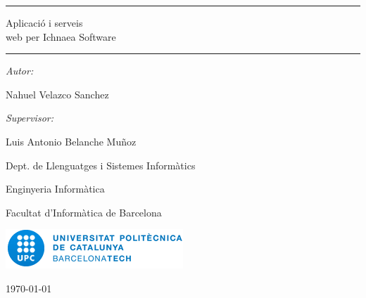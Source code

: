\begin{titlepage}

\begin{center}
\vspace{4 cm}

\hrule
\vspace{4 mm}
\huge{Aplicaci\'{o} i serveis \\
web per Ichnaea Software}
\vspace{4 mm}
\hrule

\vspace{2 cm}

\large{\emph{Autor:}}

\large{Nahuel Velazco Sanchez} \\

\vspace{1 cm}

\large{\emph{Supervisor:}}

\large{Luis Antonio Belanche Muñoz} \\

\vspace{1 cm}

\large{Dept. de Llenguatges i Sistemes Inform\`{a}tics} \\

\vspace{4 cm}

\large{Enginyeria Inform\`{a}tica} 

\large{Facultat d'Inform\`{a}tica de Barcelona} 

\vspace{1.5 cm}

\includegraphics[scale=0.5]{upc}

\vfill

\large{\today}

\end{center}

\end{titlepage}
